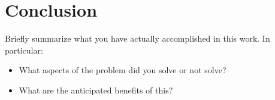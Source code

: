 \chapter{Conclusion}

Briefly summarize what you have actually accomplished in this work.  In particular:
\begin{itemize}
    \item What aspects of the problem did you solve or not solve?
    \item What are the anticipated benefits of this?
\end{itemize} 